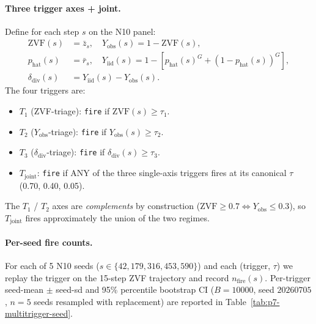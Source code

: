 \paragraph{Three trigger axes + joint.}
Define for each step $s$ on the N10 panel:
\begin{align*}
\mathrm{ZVF}(s)      &= \bar z_s, \quad
Y_{\mathrm{obs}}(s)  = 1 - \mathrm{ZVF}(s), \\
p_{\mathrm{hat}}(s)  &= \bar r_s, \quad
Y_{\mathrm{iid}}(s)  = 1 - [p_{\mathrm{hat}}(s)^G + (1-p_{\mathrm{hat}}(s))^G], \\
\delta_{\mathrm{div}}(s) &= Y_{\mathrm{iid}}(s) - Y_{\mathrm{obs}}(s).
\end{align*}
The four triggers are:
\begin{itemize}\itemsep0pt
  \item $T_1$ (ZVF-triage): \texttt{fire} if $\mathrm{ZVF}(s) \geq \tau_1$.
  \item $T_2$ ($Y_{\mathrm{obs}}$-triage): \texttt{fire} if
        $Y_{\mathrm{obs}}(s) \geq \tau_2$.
  \item $T_3$ ($\delta_{\mathrm{div}}$-triage): \texttt{fire} if
        $\delta_{\mathrm{div}}(s) \geq \tau_3$.
  \item $T_{\mathrm{joint}}$: \texttt{fire} if ANY of the three single-axis
        triggers fires at its canonical $\tau$ (0.70, 0.40, 0.05).
\end{itemize}
The $T_1$ / $T_2$ axes are \emph{complements} by construction
($\mathrm{ZVF} \geq 0.7 \Leftrightarrow Y_{\mathrm{obs}} \leq 0.3$),
so $T_{\mathrm{joint}}$ fires approximately the union of the two
regimes.

\paragraph{Per-seed fire counts.}
For each of 5 N10 seeds ($s \in \{42, 179, 316, 453, 590\}$) and each
(trigger, $\tau$) we replay the trigger on the 15-step ZVF
trajectory and record $n_{\mathrm{fire}}(s)$.  Per-trigger seed-mean
$\pm$ seed-sd and 95\% percentile bootstrap CI ($B{=}10000$,
seed $20260705$, $n{=}5$ seeds resampled with replacement) are
reported in Table~\ref{tab:p7-multitrigger-seed}.

